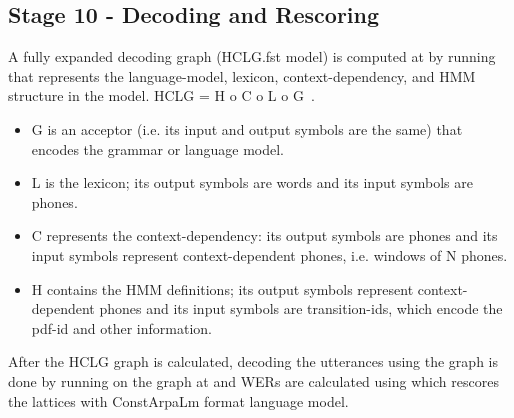 \subsection{ Stage 10 - Decoding and Rescoring}
A fully expanded decoding graph (HCLG.fst model) is computed at  by running  that represents the language-model, lexicon, context-dependency, and HMM structure in the model. HCLG = H o C o L o G~\cite{decodinggraph}.

\begin{itemize}
    \item G is an acceptor (i.e. its input and output symbols are the same) that encodes the grammar or language model.
    \item L is the lexicon; its output symbols are words and its input symbols are phones.
    \item C represents the context-dependency: its output symbols are phones and its input symbols represent context-dependent phones, i.e. windows of N phones.
    \item H contains the HMM definitions; its output symbols represent context-dependent phones and its input symbols are transition-ids, which encode the pdf-id and other information. 
\end{itemize}

After the HCLG graph is calculated, decoding the utterances using the graph is done by running  on the graph at  and WERs are calculated using  which rescores the lattices with ConstArpaLm format language model.